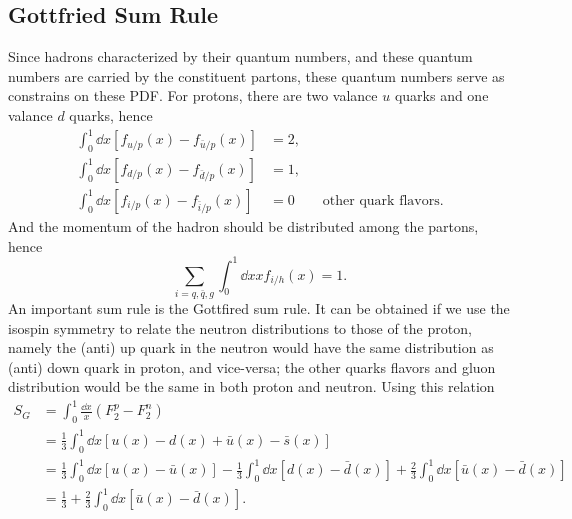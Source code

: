 \subsection{Gottfried Sum Rule}
\label{sec:gottfried}
Since hadrons characterized by their quantum numbers, and these quantum numbers 
are carried by the constituent partons, these quantum numbers serve as constrains
on these PDF. For protons, there are two valance $u$ quarks and one valance $d$ 
quarks, hence
\begin{equation}
\begin{split}
	\int_{0}^{1} \dd{x} \left[f_{u/p} \left(x\right)-f_{\bar{u}/p} \left(x\right)\right]&=2,\\
	\int_{0}^{1} \dd{x} \left[f_{d/p} \left(x\right)-f_{\bar{d}/p} \left(x\right)\right]&=1,\\
	\int_{0}^{1} \dd{x} \left[f_{i/p} \left(x\right)-f_{\bar{i}/p} \left(x\right)\right]&=0 \qquad \text{other quark flavors}.
\end{split}
\end{equation}
And the momentum of the hadron should be distributed among the partons, hence
\begin{equation}
	\sum_{i=q,\bar{q},g}\int_{0}^{1} \dd{x} xf_{i/h}\left(x\right)=1.
\end{equation}
An important sum rule is the Gottfired sum rule\cite{gottfried1967}. It can be obtained
if we use the isospin symmetry to relate the neutron distributions to those of 
the proton, namely the (anti) up quark in the neutron would have the same distribution 
as (anti) down quark in proton, and vice-versa; the other quarks flavors and gluon
distribution would be the same in both proton and neutron. Using this relation
\begin{equation}
\begin{split}
	S_G & = \int_0^1 \frac{\dd{x}}{x}\left(F_2^{p} - F_{2}^{n}\right)\\
	    & = \frac{1}{3} \int_0^1 \dd{x} \left[u\left(x\right) - d\left(x\right) 
			+ \bar{u}\left(x\right) - \bar{s}\left(x\right)\right]\\
		& = \frac{1}{3} \int_0^1 \dd{x} \left[u\left(x\right) - \bar{u}\left(x\right)\right]
			- \frac{1}{3} \int_0^1 \dd{x} \left[d\left(x\right) - \bar{d}\left(x\right)\right]
			+ \frac{2}{3} \int_0^1 \dd{x} \left[\bar{u}\left(x\right)-\bar{d}\left(x\right)\right]\\
		& = \frac{1}{3} + \frac{2}{3} \int_0^1 \dd{x} \left[\bar{u}\left(x\right)-\bar{d}\left(x\right)\right]. 
\end{split}
\end{equation}
